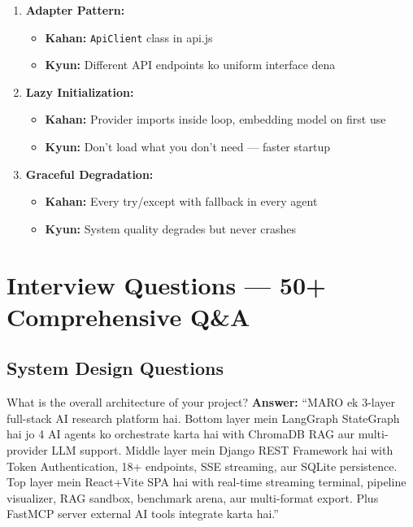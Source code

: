 \documentclass[11pt,a4paper,twoside]{report}
\begin{document}
\begin{enumerate}[label=\textbf{\arabic*.}]
\item \textbf{Adapter Pattern:}
\begin{itemize}
    \item \textbf{Kahan:} \texttt{ApiClient} class in api.js
    \item \textbf{Kyun:} Different API endpoints ko uniform interface dena
\end{itemize}

\item \textbf{Lazy Initialization:}
\begin{itemize}
    \item \textbf{Kahan:} Provider imports inside loop, embedding model on first use
    \item \textbf{Kyun:} Don't load what you don't need --- faster startup
\end{itemize}

\item \textbf{Graceful Degradation:}
\begin{itemize}
    \item \textbf{Kahan:} Every try/except with fallback in every agent
    \item \textbf{Kyun:} System quality degrades but never crashes
\end{itemize}

\end{enumerate}



\chapter{Interview Questions --- 50+ Comprehensive Q\&A}

\section{System Design Questions}

\begin{interviewbox}{What is the overall architecture of your project?}
\textbf{Answer:} ``MARO ek 3-layer full-stack AI research platform hai. Bottom layer mein LangGraph StateGraph hai jo 4 AI agents ko orchestrate karta hai with ChromaDB RAG aur multi-provider LLM support. Middle layer mein Django REST Framework hai with Token Authentication, 18+ endpoints, SSE streaming, aur SQLite persistence. Top layer mein React+Vite SPA hai with real-time streaming terminal, pipeline visualizer, RAG sandbox, benchmark arena, aur multi-format export. Plus FastMCP server external AI tools integrate karta hai.''
\end{interviewbox}
\end{document}
